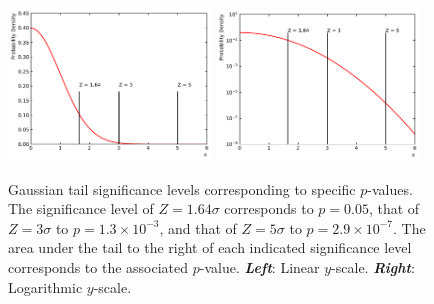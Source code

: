 \begin{figure}[!htb]
    \begin{center}
        \includegraphics[width=0.48\textwidth]{figures/common_ana/stat_hypo/pval_sig_lin}
        \includegraphics[width=0.48\textwidth]{figures/common_ana/stat_hypo/pval_sig_log}
        \caption{
            Gaussian tail significance levels corresponding to specific $p$-values.
            The significance level of $Z=1.64\sigma$ corresponds to $p = 0.05$,
            that of $Z=3\sigma$ to $p = 1.3 \times 10^{-3}$, and that of
            $Z = 5\sigma$ to $p = 2.9\times 10^{-7}$.
            The area under the tail to the right of each indicated significance level corresponds to
            the associated $p$-value.
            \textbf{\textit{Left}}: Linear $y$-scale. \textbf{\textit{Right}}: Logarithmic $y$-scale.
        }
        \label{fig:pval_sig}
    \end{center}
\end{figure}




